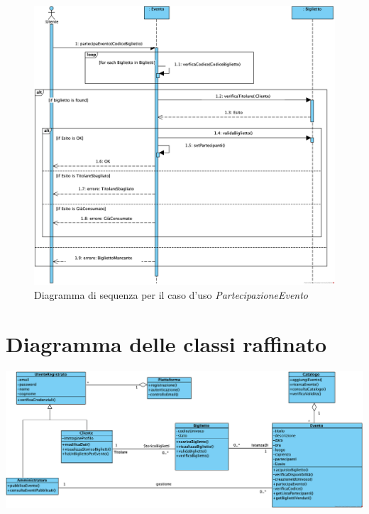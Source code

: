 \begin{figure}[H]
    \centering
    \includegraphics[height=0.38\textheight]{assets/casid'uso/PartecipazioneEvento.png}
    \caption{Diagramma di sequenza per il caso d'uso \emph{PartecipazioneEvento}}
    \label{fig:partecipazione}
\end{figure}

\section{Diagramma delle classi raffinato}
\begin{center}	
	\vspace{1ex}
	\includegraphics[height=0.38\linewidth]{assets/casid'uso/DiagrammaDelleClassiRaffinato.png}
	\vspace{1ex}
\end{center}